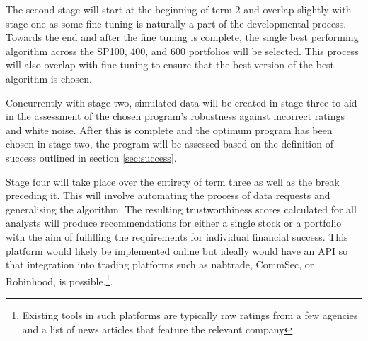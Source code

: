 The second stage will start at the beginning of term 2 and overlap slightly with stage one as some fine tuning is naturally a part of the developmental process. Towards the end and after the fine tuning is complete, the single best performing algorithm across the SP100, 400, and 600 portfolios will be selected. This process will also overlap with fine tuning to ensure that the best version of the best algorithm is chosen.

Concurrently with stage two, simulated data will be created in stage three to aid in the assessment of the chosen program's robustness against incorrect ratings and white noise. After this is complete and the optimum program has been chosen in stage two, the program will be assessed based on the definition of success outlined in section \ref{sec:success}.

Stage four will take place over the entirety of term three as well as the break preceding it. This will involve automating the process of data requests and generalising the algorithm. The resulting trustworthiness scores calculated for all analysts will produce recommendations for either a single stock or a portfolio with the aim of fulfilling the requirements for individual financial success. This platform would likely be implemented online but ideally would have an API so that integration into trading platforms such as nabtrade, CommSec, or Robinhood, is possible.\footnote{Existing tools in such platforms are typically raw ratings from a few agencies and a list of news articles that feature the relevant company}.

